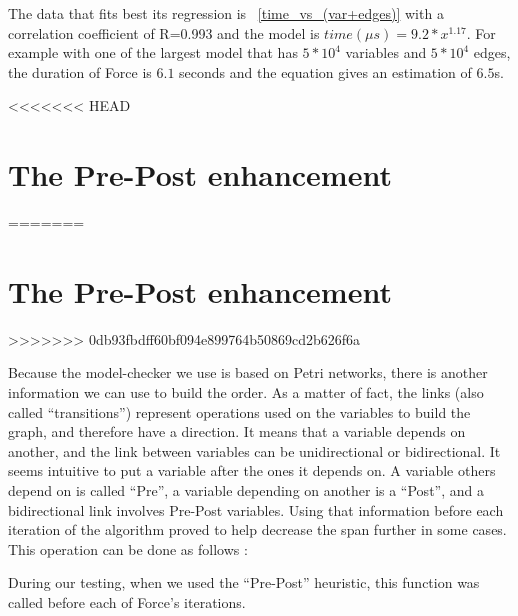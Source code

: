 \documentclass[12pt]{report}
\begin{document}
The data that fits best its regression is ~\ref{time_vs_(var+edges)} with a correlation coefficient of R=0.993 and the model is $time({\mu}s)= {9.2}*x^{1.17}$. For example with one of the largest model that has $5*10^4$ variables and $5*10^4$ edges, the duration of Force is $6.1$ seconds and the equation gives an estimation of $6.5$s.

<<<<<<< HEAD
\section{The Pre-Post enhancement} \label{sec:pre_post}
=======
\newpage
\section{The Pre-Post enhancement}
>>>>>>> 0db93fbdff60bf094e899764b50869cd2b626f6a

Because the model-checker we use is based on Petri networks, there is another information we can use to build the order. As a matter of fact, the links (also called \enquote{transitions}) represent operations used on the variables to build the graph, and therefore have a direction. It means that a variable depends on another, and the link between variables can be unidirectional or bidirectional. It seems intuitive to put a variable after the ones it depends on. A variable others depend on is called \enquote{Pre}, a variable depending on another is a \enquote{Post}, and a bidirectional link involves Pre-Post variables. Using that information before each iteration of the algorithm proved to help decrease the span further in some cases.
This operation can be done as follows :

\begin{algorithm}
\begin{algorithmic}[1]
  \EndFor
\EndFunction
\label{order-pre-post}
\end{algorithmic}
\end{algorithm}

During our testing, when we used the \enquote{Pre-Post} heuristic, this function was called before each of Force's iterations.
\end{document}
